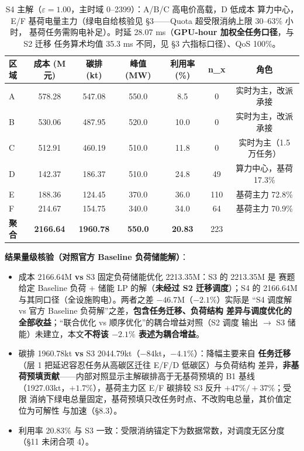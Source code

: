 \documentclass{internal-report}
\begin{document}
\begin{table}[H]
\centering
\footnotesize
\begin{tabular}{lcccccc}
\toprule
区域 & 成本 (M元) & 碳排 (kt) & 峰值 (MW) & 利用率 (\%) & n\_x & 角色 \\
\midrule
A & 578.28 & 547.08 & 550.0 & 8.5 & 0 & 实时为主，改派承接 \\
B & 530.06 & 487.95 & 520.0 & 10.0 & 0 & 实时为主，改派承接 \\
C & 512.91 & 460.19 & 510.0 & 11.8 & 0 & 实时为主（1.5 万任务） \\
D & 142.37 & 186.37 & 510.0 & 24.8 & 49 & 算力中心，基荷 17.3\% \\
E & 188.36 & 124.45 & 370.0 & 36.0 & 110 & 基荷主力 72.8\% \\
F & 214.67 & 154.75 & 340.0 & 34.0 & 64 & 基荷主力 70.9\% \\
\midrule
\textbf{聚合} & \textbf{2166.64} & \textbf{1960.78} & \textbf{550.0} & \textbf{20.83} & 223 & \\
\bottomrule
\end{tabular}
\caption{S4 主解（$\varepsilon{=}1.00$，主时域 0--2399）：A/B/C 高电价高载，D 低成本
算力中心，E/F 基荷电量主力（绿电自给核验见 §3——Quota 超受限消纳上限 30--63\% 小时，
基荷任务需购电补足）。时延 28.07 ms（\textbf{GPU-hour 加权全任务口径}，与 S2 迁移
任务算术均值 35.3 ms 不同，见 §3 六指标口径）、QoS 100\%。}
\label{tab:s4main}
\end{table}

\textbf{结果量级核验（对照官方 Baseline 负荷储能解）}：
\begin{itemize}
  \item 成本 2166.64M \textbf{vs} S3 固定负荷储能优化 2213.35M：S3 的 2213.35M 是
        赛题给定 Baseline 负荷 + 储能 LP 的解（\textbf{未经过 S2 迁移调度}）；S4 的
        2166.64M 与其同口径（全设施购电）。两者之差 $-46.7$M（$-2.1\%$）实际是
        ``S4 调度解 vs 官方 Baseline 负荷解''之差，\textbf{包含任务迁移、负荷结构
        差异与调度优化的全部收益}；``联合优化 vs 顺序优化''的耦合增益对照（S2 调度
        输出 $\to$ S3 储能）未建立，本文\textbf{不将该 $-2.1\%$ 表述为耦合增益}。
  \item 碳排 1960.78kt \textbf{vs} S3 2044.79kt（$-84$kt，$-4.1\%$）：降幅主要来自
        \textbf{任务迁移}（层 1 把延迟容忍任务从高碳区迁往 E/F/D 低碳区）与负荷结构
        差异，\textbf{非基荷预填贡献}——内部对照显示主解碳排高于无基荷预填的 B1 基线
        （1927.03kt，$+1.7\%$），基荷主力区 E/F 碳排较 S3 反升 $+47\%/+37\%$；受限
        消纳下绿电总量固定，基荷预填只改任务时点、不改购电总量，其价值定位为可解性
        与加速（§8.3）。
  \item 利用率 20.83\% 与 S3 一致：受限消纳锚定下为数据常数，对调度无区分度
        （§11 未闭合项 4）。
\end{itemize}
\end{document}

